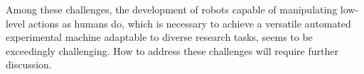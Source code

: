 Among these challenges, the development of robots capable of manipulating low-level actions as humans do, which is necessary to achieve a versatile automated experimental machine adaptable to diverse research tasks, seems to be exceedingly challenging. How to address these challenges will require further discussion.





